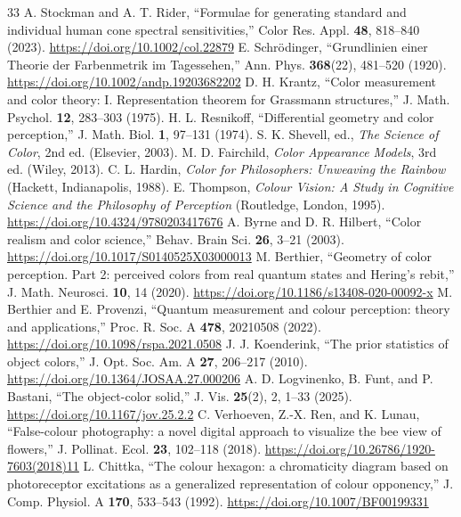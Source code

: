 \documentclass[11pt,letterpaper]{article}
\theoremstyle{plain}
\begin{document}
\begin{thebibliography}{33}
 A. Stockman and A. T. Rider, ``Formulae for generating standard and individual human cone spectral sensitivities,'' Color Res. Appl. \textbf{48}, 818--840 (2023). \url{https://doi.org/10.1002/col.22879}
 E. Schr\"odinger, ``Grundlinien einer Theorie der Farbenmetrik im Tagessehen,'' Ann. Phys. \textbf{368}(22), 481--520 (1920). \url{https://doi.org/10.1002/andp.19203682202}
 D. H. Krantz, ``Color measurement and color theory: I. Representation theorem for Grassmann structures,'' J. Math. Psychol. \textbf{12}, 283--303 (1975).
 H. L. Resnikoff, ``Differential geometry and color perception,'' J. Math. Biol. \textbf{1}, 97--131 (1974).
 S. K. Shevell, ed., \emph{The Science of Color}, 2nd ed. (Elsevier, 2003).
 M. D. Fairchild, \emph{Color Appearance Models}, 3rd ed. (Wiley, 2013).
 C. L. Hardin, \emph{Color for Philosophers: Unweaving the Rainbow} (Hackett, Indianapolis, 1988).
 E. Thompson, \emph{Colour Vision: A Study in Cognitive Science and the Philosophy of Perception} (Routledge, London, 1995). \url{https://doi.org/10.4324/9780203417676}
 A. Byrne and D. R. Hilbert, ``Color realism and color science,'' Behav. Brain Sci. \textbf{26}, 3--21 (2003). \url{https://doi.org/10.1017/S0140525X03000013}
 M. Berthier, ``Geometry of color perception. Part 2: perceived colors from real quantum states and Hering's rebit,'' J. Math. Neurosci. \textbf{10}, 14 (2020). \url{https://doi.org/10.1186/s13408-020-00092-x}
 M. Berthier and E. Provenzi, ``Quantum measurement and colour perception: theory and applications,'' Proc. R. Soc. A \textbf{478}, 20210508 (2022). \url{https://doi.org/10.1098/rspa.2021.0508}
 J. J. Koenderink, ``The prior statistics of object colors,'' J. Opt. Soc. Am. A \textbf{27}, 206--217 (2010). \url{https://doi.org/10.1364/JOSAA.27.000206}
 A. D. Logvinenko, B. Funt, and P. Bastani, ``The object-color solid,'' J. Vis. \textbf{25}(2), 2, 1--33 (2025). \url{https://doi.org/10.1167/jov.25.2.2}
 C. Verhoeven, Z.-X. Ren, and K. Lunau, ``False-colour photography: a novel digital approach to visualize the bee view of flowers,'' J. Pollinat. Ecol. \textbf{23}, 102--118 (2018). \url{https://doi.org/10.26786/1920-7603(2018)11}
 L. Chittka, ``The colour hexagon: a chromaticity diagram based on photoreceptor excitations as a generalized representation of colour opponency,'' J. Comp. Physiol. A \textbf{170}, 533--543 (1992). \url{https://doi.org/10.1007/BF00199331}

\end{thebibliography}
\end{document}

